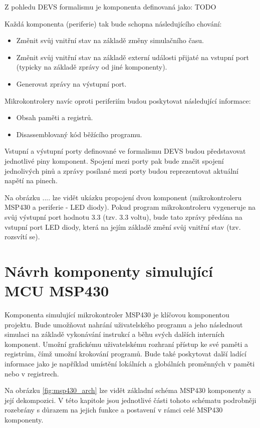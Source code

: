Z pohledu DEVS formalismu je komponenta definovaná jako: TODO

Každá komponenta (periferie) tak bude schopna následujícího chování:

\begin{itemize}
\item Změnit svůj vnitřní stav na základě změny simulačního času.
\item Změnit svůj vnitřní stav na základě externí události přijaté na vstupní port (typicky na základě zprávy od jiné komponenty).
\item Generovat zprávy na výstupní port.
\end{itemize}

Mikrokontrolery navíc oproti periferiím budou poskytovat následující informace:

\begin{itemize}
\item Obsah paměti a registrů.
\item Disassemblovaný kód běžícího programu.
\end{itemize}

Vstupní a výstupní porty definované ve formalismu DEVS budou představovat jednotlivé piny komponent. Spojení mezi porty pak bude značit spojení jednolivých
pinů a zprávy posílané mezi porty budou reprezentovat aktuální napětí na pinech.

Na obrázku .... lze vidět ukázku propojení dvou komponent (mikrokontroleru MSP430 a periferie - LED diody). Pokud program mikrokontroleru vygeneruje na svůj 
výstupní port hodnotu 3.3 (tzv. 3.3 voltu), bude tato zprávy předána na vstupní port LED diody, která na jejím základě změní svůj vnitřní stav (tzv. rozsvítí se).

\section{Návrh komponenty simulující MCU MSP430}

Komponenta simulující mikrokontroler MSP430 je klíčovou komponentou projektu. Bude umožňovat nahrání uživatelského programu a jeho
následnout simulaci na základě vykonávání instrukcí a běhu svých dalších interních komponent. Umožní grafickému uživatelskému
rozhraní přístup ke své paměti a registrům, čímž umožní krokování programů. Bude také poskytovat další ladící informace jako je například
umístění lokálních a globálních proměnných v paměti nebo v registrech. \cite{cvs}

Na obrázku \ref{fig:msp430_arch} lze vidět základní schéma MSP430 komponenty a její dekompozici. V této kapitole jsou jednotlivé části tohoto schématu podrobněji rozebrány s důrazem na jejich funkce a postavení v rámci celé MSP430 komponenty.

